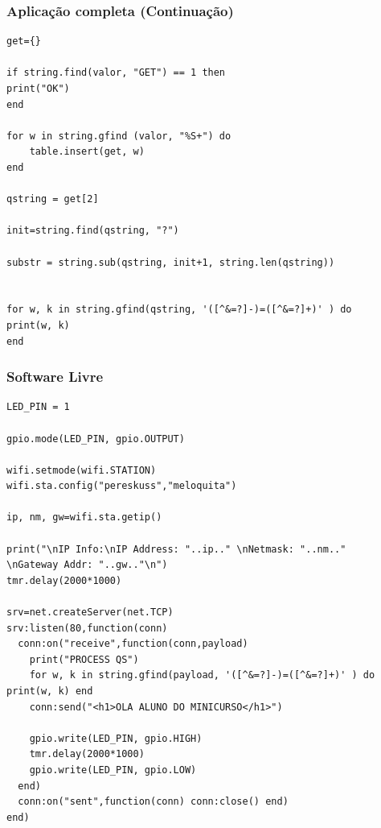 \documentclass{beamer}
\begin{document}
\begin{frame}[fragile]
\frametitle{Aplicação completa (Continuação)}

\tiny
\begin{lstlisting}
get={}

if string.find(valor, "GET") == 1 then
print("OK")
end

for w in string.gfind (valor, "%S+") do
    table.insert(get, w)
end

qstring = get[2]

init=string.find(qstring, "?")

substr = string.sub(qstring, init+1, string.len(qstring))


for w, k in string.gfind(qstring, '([^&=?]-)=([^&=?]+)' ) do
print(w, k)
end

\end{lstlisting}
\end{frame}

\begin{frame}[fragile]
\frametitle{Software Livre}
\tiny
\begin{lstlisting}
LED_PIN = 1

gpio.mode(LED_PIN, gpio.OUTPUT)

wifi.setmode(wifi.STATION)
wifi.sta.config("pereskuss","meloquita")

ip, nm, gw=wifi.sta.getip()

print("\nIP Info:\nIP Address: "..ip.." \nNetmask: "..nm.." 
\nGateway Addr: "..gw.."\n")
tmr.delay(2000*1000)

srv=net.createServer(net.TCP)
srv:listen(80,function(conn)
  conn:on("receive",function(conn,payload)
    print("PROCESS QS")
    for w, k in string.gfind(payload, '([^&=?]-)=([^&=?]+)' ) do print(w, k) end
    conn:send("<h1>OLA ALUNO DO MINICURSO</h1>")
    
    gpio.write(LED_PIN, gpio.HIGH)
    tmr.delay(2000*1000)
    gpio.write(LED_PIN, gpio.LOW)
  end)
  conn:on("sent",function(conn) conn:close() end)
end)
\end{lstlisting}
\end{frame}
\end{document}
